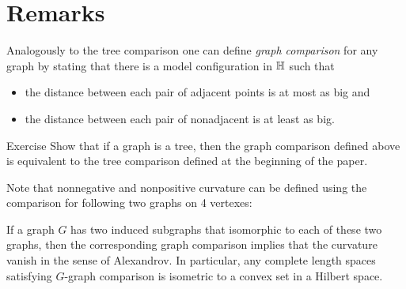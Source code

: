 \section{Remarks}


Analogously to the tree comparison one can define \emph{graph comparison} for any graph by stating that there is a model configuration in $\mathbb{H}$ such that 
\begin{itemize}
\item the distance between each pair of adjacent points is at most as big 
and
\item the distance between each pair of nonadjacent is at least as big.
\end{itemize}

\begin{thm}{Exercise}
Show that if a graph is a tree, then the graph comparison defined above is equivalent to the tree comparison defined at the beginning of the paper.
\end{thm}


Note that nonnegative and nonpositive curvature can be defined using the comparison for following two graphs on 4 vertexes:

\begin{center}
\hskip30mm
\end{center}
If a graph $G$ has two induced subgraphs that isomorphic to each of these two graphs, then the corresponding graph comparison implies that the curvature vanish in the sense of Alexandrov.
In particular, any complete length spaces satisfying $G$-graph comparison is isometric to a convex set in a Hilbert space. 

